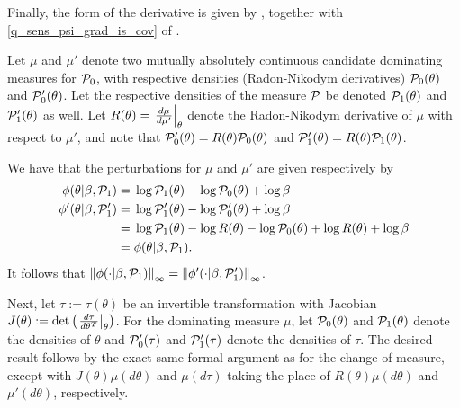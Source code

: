 Finally, the form of the derivative is given by \citet[Theorem
3.3.1]{krantz:2012:implicit}, together with \eqref{q_sens_psi_grad_is_cov} of
.
%

\vspace{1em}

%
Let $\mu$ and $\mu'$ denote two mutually absolutely continuous candidate
dominating measures for $\mathcal{P}_{0}$, with respective densities (Radon-Nikodym
derivatives) $\mathcal{P}_{0}(\theta)$ and $\mathcal{P}_{0}'(\theta)$.  Let the respective
densities of the measure $\mathcal{P}$ be denoted $\mathcal{P}_{1}(\theta)$ and $\mathcal{P}_{1}'(\theta)$ as
well.  Let $R(\theta) = \left.\frac{d\mu}{d\mu'}\right\vert_{\theta}$ denote the Radon-Nikodym
derivative of $\mu$ with respect to $\mu'$, and note that $\mathcal{P}_{0}'(\theta) =
R(\theta) \mathcal{P}_{0}(\theta)$ and $\mathcal{P}_{1}'(\theta) = R(\theta) \mathcal{P}_{1}(\theta)$.

We have that the perturbations for $\mu$ and $\mu'$ are given respectively by
%
\begin{align*}
%
\phi(\theta \vert \beta, \palt) ={}&
  \log \palt(\theta) - \log \pbase(\theta) + \log \beta \\
\phi'(\theta \vert \beta, \palt') ={}&
    \log \palt'(\theta) - \log \pbase'(\theta) + \log \beta
\\={}&
\log \palt(\theta) - \log R(\theta)
    - \log \pbase(\theta) + \log R(\theta)+ \log \beta
\\={}&
\phi(\theta \vert \beta, \palt).
%
\end{align*}
%
It follows that $\left\Vert\phi(\cdot \vert \beta, \mathcal{P}_{1})\right\Vert_{\infty} = \left\Vert\phi'(\cdot
\vert \beta, \mathcal{P}_{1}')\right\Vert_{\infty}$.

Next, let $\tau := \tau(\theta)$ be an invertible transformation with Jacobian
$J(\theta) := \mathrm{det}\left(\left.\frac{d\tau}{d\theta^T}\right\vert_{\theta}\right)$. For
the dominating measure $\mu$, let $\mathcal{P}_{0}(\theta)$ and $\mathcal{P}_{1}(\theta)$ denote
the densities of $\theta$ and $\mathcal{P}_{0}'(\tau)$ and $\mathcal{P}_{1}'(\tau)$ denote the
densities of $\tau$.  The desired result follows by the exact same formal
argument as for the change of measure, except with $J(\theta) \mu(d\theta)$
and $\mu(d\tau)$ taking the place of $R(\theta) \mu(d\theta)$ and
$\mu'(d\theta)$, respectively.

